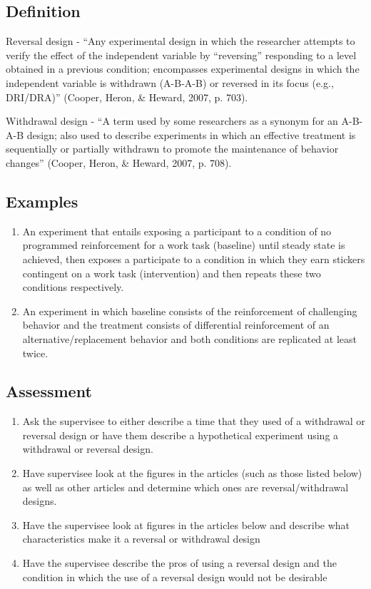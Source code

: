 \subsection{Definition}
Reversal design - ``Any experimental design in which the researcher attempts to verify the effect of the independent variable by ``reversing'' responding to a level obtained in a previous condition; encompasses experimental designs in which the independent variable is withdrawn (A-B-A-B) or reversed in its focus (e.g., DRI/DRA)'' (Cooper, Heron, \& Heward, 2007, p. 703).

Withdrawal design - ``A term used by some researchers as a synonym for an A-B-A-B design; also used to describe experiments in which an effective treatment is sequentially or partially withdrawn to promote the maintenance of behavior changes'' (Cooper, Heron, \& Heward, 2007, p. 708).
%
\subsection{Examples}
\begin{enumerate}
\item An experiment that entails exposing a participant to a condition of no programmed reinforcement for a work task (baseline) until steady state is achieved, then exposes a participate to a condition in which they earn stickers contingent on a work task (intervention) and then repeats these two conditions respectively. 
\item An experiment in which baseline consists of the reinforcement of challenging behavior and the treatment consists of differential reinforcement of an alternative/replacement behavior and both conditions are replicated at least twice. 
\end{enumerate}
%
\subsection{Assessment}
\begin{enumerate}
\item  Ask the supervisee to either describe a time that they used of a withdrawal or reversal design or have them describe a hypothetical experiment using a withdrawal or reversal design. 
\item Have supervisee look at the figures in the articles (such as those listed below) as well as other articles and determine which ones are reversal/withdrawal designs. 
\item Have the supervisee look at figures in the articles below and describe what characteristics make it a reversal or withdrawal design
\item Have the supervisee describe the pros of using a reversal design and the condition in which the use of a reversal design would not be desirable
\end{enumerate}
%
